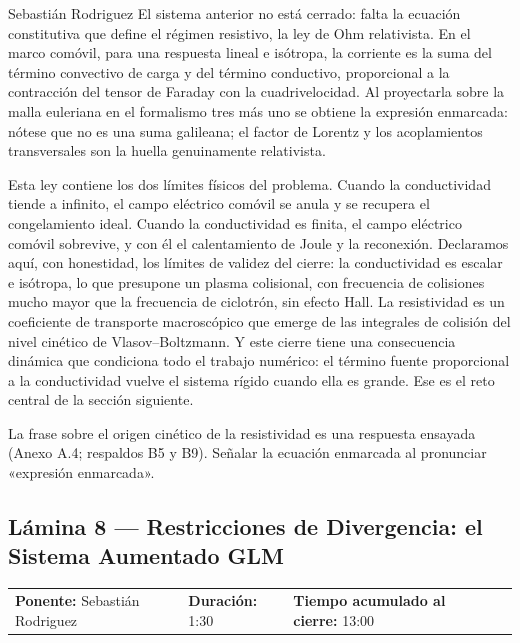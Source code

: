 \documentclass[11pt,letterpaper]{article}
\makeatletter
\newcommand{\lamina}[5]{%
  \subsection*{Lámina #1 --- #2}
  \noindent
  \begin{tabular}{@{}llll@{}}
    \textbf{Ponente:} #3 &\quad \textbf{Duración:} #4 &\quad
    \textbf{Tiempo acumulado al cierre:} #5 &
  \end{tabular}
  \vspace{2pt}}
\makeatother
\begin{document}
\begin{parlamento}{Sebastián Rodriguez}
El sistema anterior no está cerrado: falta la ecuación constitutiva que
define el régimen resistivo, la ley de Ohm relativista. En el marco comóvil,
para una respuesta lineal e isótropa, la corriente es la suma del término
convectivo de carga y del término conductivo, proporcional a la contracción
del tensor de Faraday con la cuadrivelocidad. Al proyectarla sobre la malla
euleriana en el formalismo tres más uno se obtiene la expresión enmarcada:
nótese que no es una suma galileana; el factor de Lorentz y los
acoplamientos transversales son la huella genuinamente relativista.

Esta ley contiene los dos límites físicos del problema. Cuando la
conductividad tiende a infinito, el campo eléctrico comóvil se anula y se
recupera el congelamiento ideal. Cuando la conductividad es finita, el campo
eléctrico comóvil sobrevive, y con él el calentamiento de Joule y la
reconexión. Declaramos aquí, con honestidad, los límites de validez del
cierre: la conductividad es escalar e isótropa, lo que presupone un plasma
colisional, con frecuencia de colisiones mucho mayor que la frecuencia de
ciclotrón, sin efecto Hall. La resistividad es un coeficiente de transporte
macroscópico que emerge de las integrales de colisión del nivel cinético de
Vlasov--Boltzmann. Y este cierre tiene una consecuencia dinámica que
condiciona todo el trabajo numérico: el término fuente proporcional a la
conductividad vuelve el sistema rígido cuando ella es grande. Ese es el reto
central de la sección siguiente.
\end{parlamento}

\begin{indicaciones}
La frase sobre el origen cinético de la resistividad es una respuesta
ensayada (Anexo A.4; respaldos B5 y B9). Señalar la ecuación enmarcada al
pronunciar «expresión enmarcada».
\end{indicaciones}

\lamina{8}{Restricciones de Divergencia: el Sistema Aumentado GLM}{Sebastián Rodriguez}{1:30}{13:00}
\end{document}
